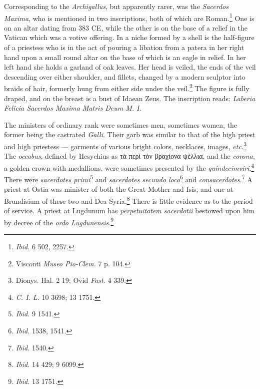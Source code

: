 \documentclass[a4paper, 11pt, oneside, polutonikogreek, english]{article}
\begin{document}
Corresponding to the \emph{Archigallus}, but apparently rarer, was the \emph{Sacerdos Maxima}, who is mentioned in two inscriptions, both of which are Roman.\footnote{\emph{Ibid.} 6 502, 2257.} One is on an altar dating from 383 \textsc{CE}, while the other is on the base of a relief in the Vatican which was a votive offering. In a niche formed by a shell is the half-figure of a priestess who is in the act of pouring a libation from a patera in her right hand upon a small round altar on the base of which is an eagle in relief. In her left hand she holds a garland of oak leaves. Her head is veiled, the ends of the veil descending over either shoulder, and fillets, changed by a modern sculptor into braids of hair, formerly hung from either side under the veil.\footnote{Visconti \emph{Museo Pio-Clem.} 7 p. 104.} The figure is fully draped, and on the breast is a bust of Idaean Zeus. The inscription reads: \emph{Laberia Felicia Sacerdos Maxima Matris Deum M. I.}

The ministers of ordinary rank were sometimes men, sometimes women, the former being the castrated \emph{Galli}. Their garb was similar to that of the high priest and high priestess --- garments of various bright colors, necklaces, images, \emph{etc.}\footnote{Dionys. Hal. 2 19; Ovid \emph{Fast.} 4 339.} The \emph{occabus}, defined by Hesychius as τὰ περὶ τὸν βραχίονα ψέλλια, and the \emph{corona}, a golden crown with medallions, were sometimes presented by the \emph{quindecimviri}.\footnote{\emph{C. I. L.} 10 3698; 13 1751.} There were \emph{sacerdotes primi}\footnote{\emph{Ibid.} 9 1541.} and \emph{sacerdotes secundo loco}\footnote{\emph{Ibid.} 1538, 1541.} and \emph{consacerdotes}.\footnote{\emph{Ibid.} 1540.} A priest at Ostia was minister of both the Great Mother and Isis, and one at Brundisium of these two and Dea Syria.\footnote{\emph{Ibid.} 14 429; 9 6099.} There is little evidence as to the period of service. A priest at Lugdunum has \emph{perpetuitatem sacerdotii} bestowed upon him by decree of the \emph{ordo Lugdunensis}.\footnote{\emph{Ibid.} 13 1751.}
\end{document}
